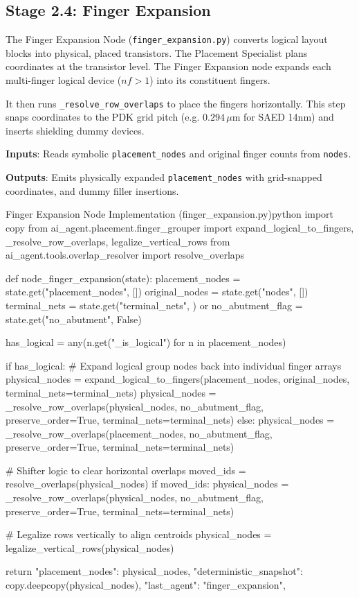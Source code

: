\subsection{Stage 2.4: Finger Expansion}
The Finger Expansion Node (\texttt{finger\_expansion.py}) converts logical layout blocks into physical, placed transistors. The Placement Specialist plans coordinates at the transistor level. The Finger Expansion node expands each multi-finger logical device ($nf > 1$) into its constituent fingers.

It then runs \texttt{\_resolve\_row\_overlaps} to place the fingers horizontally. This step snaps coordinates to the PDK grid pitch (e.g. $0.294\,\mu\text{m}$ for SAED 14nm) and inserts shielding dummy devices.

\textbf{Inputs}: Reads symbolic \texttt{placement\_nodes} and original finger counts from \texttt{nodes}.

\textbf{Outputs}: Emits physically expanded \texttt{placement\_nodes} with grid-snapped coordinates, and dummy filler insertions.

\begin{thesiscode}{Finger Expansion Node Implementation (finger\_expansion.py)}{python}
import copy
from ai_agent.placement.finger_grouper import expand_logical_to_fingers, _resolve_row_overlaps, legalize_vertical_rows
from ai_agent.tools.overlap_resolver import resolve_overlaps

def node_finger_expansion(state):
    placement_nodes = state.get("placement_nodes", [])
    original_nodes = state.get("nodes", [])
    terminal_nets = state.get("terminal_nets", {}) or {}
    no_abutment_flag = state.get("no_abutment", False)

    has_logical = any(n.get("_is_logical") for n in placement_nodes)

    if has_logical:
        # Expand logical group nodes back into individual finger arrays
        physical_nodes = expand_logical_to_fingers(placement_nodes, original_nodes, terminal_nets=terminal_nets)
        physical_nodes = _resolve_row_overlaps(physical_nodes, no_abutment_flag, preserve_order=True, terminal_nets=terminal_nets)
    else:
        physical_nodes = _resolve_row_overlaps(placement_nodes, no_abutment_flag, preserve_order=True, terminal_nets=terminal_nets)

    # Shifter logic to clear horizontal overlaps
    moved_ids = resolve_overlaps(physical_nodes)
    if moved_ids:
        physical_nodes = _resolve_row_overlaps(physical_nodes, no_abutment_flag, preserve_order=True, terminal_nets=terminal_nets)

    # Legalize rows vertically to align centroids
    physical_nodes = legalize_vertical_rows(physical_nodes)

    return {
        "placement_nodes": physical_nodes,
        "deterministic_snapshot": copy.deepcopy(physical_nodes),
        "last_agent": "finger_expansion",
    }
\end{thesiscode}

